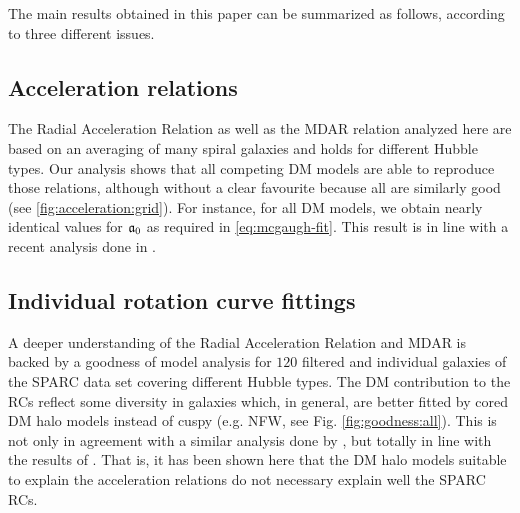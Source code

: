 The main results obtained in this paper can be summarized as follows, according to three different issues.

\subsection{Acceleration relations}
The Radial Acceleration Relation as well as the MDAR relation analyzed here are based on an averaging of many spiral galaxies and holds for different Hubble types. Our analysis shows that all competing DM models are able to reproduce those relations, although without a clear favourite because all are similarly good (see \cref{fig:acceleration:grid}). For instance, for all DM models, we obtain nearly identical values for $\mathfrak{a}_0$ as required in \cref{eq:mcgaugh-fit}. This result is in line with a recent analysis done in \citet{2020JCAP...06..027K}. 

\subsection{Individual rotation curve fittings}
A deeper understanding of the Radial Acceleration Relation and MDAR is backed by a goodness of model analysis for $120$ filtered and individual galaxies of the SPARC data set covering different Hubble types. The DM contribution to the RCs reflect some diversity in galaxies which, in general, are better fitted by cored DM halo models instead of cuspy (e.g. NFW, see Fig. \ref{fig:goodness:all}). This is not only in agreement with a similar analysis done by \citet{2020ApJS..247...31L}, but totally in line with the results of \citet{2020JCAP...06..027K}. That is, it has been shown here that the DM halo models suitable to explain the acceleration relations do not necessary explain well the SPARC RCs.

